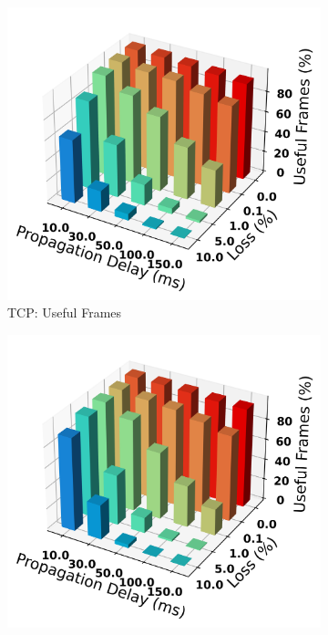 \documentclass{mpaper}
\begin{document}
\begin{figure}
  \centering
  \begin{subfigure}[b]{0.25\textwidth}
      \centering
      \includegraphics[width=\textwidth]{Frame_Usefulness_Ratio/TCP/AVG_Frame_Usefulness-42.png}
      \caption{TCP: Useful Frames}
      \label{fig:TCP_bar-42}
  \end{subfigure}
  \hfill
  \begin{subfigure}[b]{0.25\textwidth}
      \centering
      \includegraphics[width=\textwidth]{Frame_Usefulness_Ratio/QUIC_SS/AVG_Frame_Usefulness-42.png}

\end{subfigure}
\end{figure}
\end{document}
